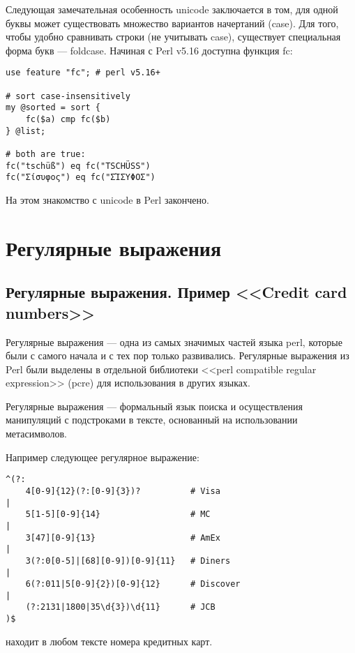 Следующая замечательная особенность unicode заключается в том, для одной буквы может существовать множество вариантов начертаний (case). Для того, чтобы удобно сравнивать строки (не учитывать case), существует специальная форма букв --- foldcase. Начиная с Perl v5.16 доступна функция fc:
\begin{verbatim}
use feature "fc"; # perl v5.16+

# sort case-insensitively
my @sorted = sort {
    fc($a) cmp fc($b)
} @list;

# both are true:
fc("tschüß") eq fc("TSCHÜSS")
fc("Σίσυφος") eq fc("ΣΊΣΥΦΟΣ")
\end{verbatim}
На этом знакомство с unicode в Perl закончено.

\section{Регулярные выражения} %
\subsection{Регулярные выражения. Пример <<Credit card numbers>>}
Регулярные выражения ---  одна из самых значимых частей языка perl, которые были с самого начала и с тех пор только развивались. Регулярные выражения из Perl были выделены в отдельной библиотеки <<perl compatible regular expression>> (pcre) для использования в других языках.

Регулярные выражения --- формальный язык поиска и осуществления манипуляций с подстроками в тексте, основанный на использовании метасимволов.

Например следующее регулярное выражение:
\begin{verbatim}
^(?:
    4[0-9]{12}(?:[0-9]{3})?          # Visa
|
    5[1-5][0-9]{14}                  # MC
|
    3[47][0-9]{13}                   # AmEx
|
    3(?:0[0-5]|[68][0-9])[0-9]{11}   # Diners
|
    6(?:011|5[0-9]{2})[0-9]{12}      # Discover
|
    (?:2131|1800|35\d{3})\d{11}      # JCB
)$
\end{verbatim}
находит в любом тексте номера кредитных карт.

